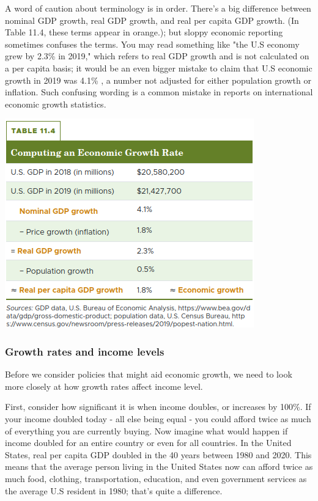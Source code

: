 \documentclass[11pt]{article} %
\theoremstyle{plain}
\theoremstyle{definition}
\begin{document}
A word of caution about terminology is in order. There's a big difference between nominal GDP growth, real GDP growth, and real per capita GDP growth. (In Table 11.4, these terms appear in orange.); but sloppy economic reporting sometimes confuses the terms. You may read something like "the U.S economy grew by 2.3\% in 2019," which refers to real GDP growth and is not calculated on a per capita basis; it would be an even bigger mistake to claim that U.S economic growth in 2019 was 4.1\% , a number not adjusted for either population growth or inflation. Such confusing wording is a common mistake in reports on international economic growth statistics.

\begin{center}
\includegraphics[scale=0.5]{../../images/Chapter 11/table 11.4 .png}
\end{center}

\subsubsection*{Growth rates and income levels}

Before we consider policies that might aid economic growth, we need to look more closely at how growth rates affect income level.

First, consider how significant it is when income doubles, or increases by 100\%. If your income doubled today - all else being equal - you could afford twice as much of everything you are currently buying. Now imagine what would happen if income doubled for an entire country or even for all countries. In the United States, real per capita GDP doubled in the 40 years between 1980 and 2020. This means that the average person living in the United States now can afford twice as much food, clothing, transportation, education, and even government services as the average U.S resident in 1980; that's quite a difference.
\end{document}
